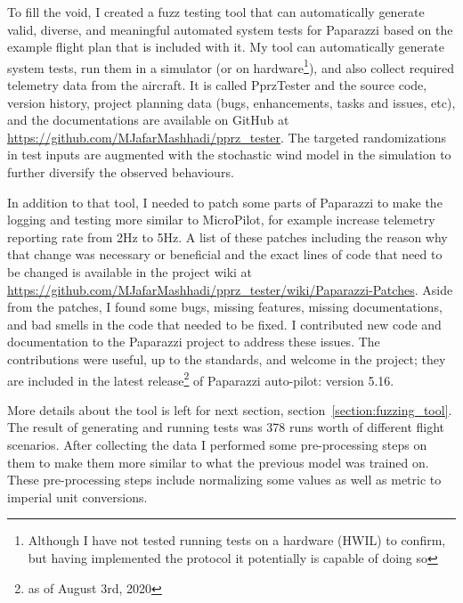 To fill the void, I created a fuzz testing tool that can automatically generate valid, diverse, and meaningful automated system tests for Paparazzi based on the example flight plan that is included with it.
My tool can automatically generate system tests, run them in a simulator (or on hardware\footnote{Although I have not tested running tests on a hardware (HWIL) to confirm, but having implemented the protocol it potentially is capable of doing so}), and also collect required telemetry data from the aircraft. 
It is called PprzTester and the source code, version history, project planning data (bugs, enhancements, tasks and issues, etc), and the documentations are available on GitHub at \url{https://github.com/MJafarMashhadi/pprz_tester}. 
The targeted randomizations in test inputs are augmented with the stochastic wind model in the simulation to further diversify the observed behaviours.

In addition to that tool, I needed to patch some parts of Paparazzi to make the logging and testing more similar to MicroPilot, for example increase telemetry reporting rate from 2Hz to 5Hz. A list of these patches including the reason why that change was necessary or beneficial and the exact lines of code that need to be changed is available in the project wiki at \url{https://github.com/MJafarMashhadi/pprz_tester/wiki/Paparazzi-Patches}.
Aside from the patches, I found some bugs, missing features, missing documentations, and bad smells in the code that needed to be fixed. I contributed new code and documentation to the Paparazzi project to address these issues. The contributions were useful, up to the standards, and welcome in the project; they are included in the latest release\footnote{as of August 3rd, 2020} of Paparazzi auto-pilot: version 5.16.

More details about the tool is left for next section, section~\ref{section:fuzzing_tool}.
The result of generating and running tests was 378 runs worth of different flight scenarios.
After collecting the data I performed some pre-processing steps on them to make them more similar to what the previous model was trained on. These pre-processing steps include normalizing some values as well as metric to imperial unit conversions.


